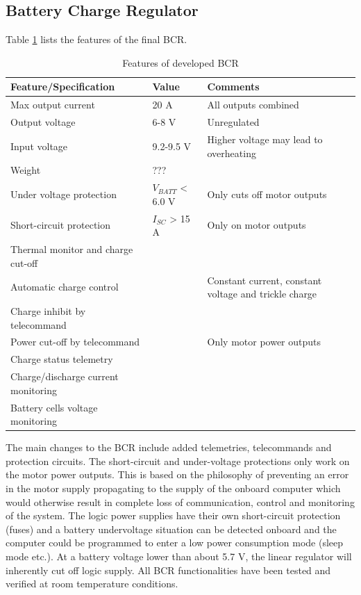 \subsection{Battery Charge Regulator}
%
Table \ref{tab:BCR_features} lists the features of the final \ac{BCR}.
%
\begin{table}[H]
\centering
\caption{Features of developed \ac{BCR}}
\label{tab:BCR_features}
\begin{tabular}{p{}p{}p{}}
\hline
\textbf{Feature/Specification} & \textbf{Value} & \textbf{Comments}\\
\hline
Max output current & 20 A & All outputs combined \\
Output voltage & 6-8 V & Unregulated \\
Input voltage & 9.2-9.5 V & Higher voltage may lead to overheating\\
Weight & ??? & \\
Under voltage protection & $V_{BATT}$ < 6.0 V & Only cuts off motor outputs \\
Short-circuit protection & $I_{SC}$ > 15 A & Only on motor outputs \\
Thermal monitor and charge cut-off & & \\
Automatic charge control &  & Constant current, constant voltage and trickle charge\\
Charge inhibit by telecommand & & \\
Power cut-off by telecommand & & Only motor power outputs\\
Charge status telemetry & &\\
Charge/discharge current monitoring & & \\
Battery cells voltage monitoring & & \\
\hline
\end{tabular}
\end{table} 
%
The main changes to the \ac{BCR} include added telemetries, telecommands and protection circuits. The short-circuit and under-voltage protections only work on the motor power outputs. This is based on the philosophy of preventing an error in the motor supply propagating to the supply of the onboard computer which would otherwise result in complete loss of communication, control and monitoring of the system. The logic power supplies have their own short-circuit protection (fuses) and a battery undervoltage situation can be detected onboard and the computer could be programmed to enter a low power consumption mode (sleep mode etc.). At a battery voltage lower than about 5.7 V, the linear regulator will inherently cut off logic supply.
%
%
All \ac{BCR} functionalities have been tested and verified at room temperature conditions.
%
%
